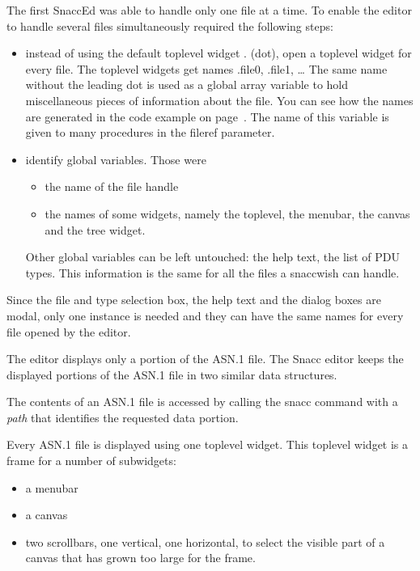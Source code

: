The first SnaccEd was able to handle only one file at a time.
To enable the editor to handle several files simultaneously required the following steps:
\begin{itemize}
  \item instead of using the default toplevel widget {\Tcl .} (dot), open a toplevel widget for every file.
    The toplevel widgets get names {\Tcl .file0}, {\Tcl .file1}, \dots
    The same name without the leading dot is used as a global array variable to hold miscellaneous pieces of information about the file.
    You can see how the names are generated in the code example on page~\pageref{tcl-name-space-example-code}.
    The name of this variable is given to many procedures in the {\Tcl fileref} parameter.
  \item identify global variables. Those were
    \begin{itemize}
      \item the name of the file handle
      \item the names of some widgets, namely the toplevel, the menubar, the canvas and the tree widget.
    \end{itemize}
    Other global variables can be left untouched: the help text, the list of PDU types.
    This information is the same for all the files a snaccwish can handle.
\end{itemize}

Since the file and type selection box, the help text and the dialog boxes are modal, only one instance is needed and they can have the same names for every file opened by the editor.

The editor displays only a portion of the ASN.1 file.
The Snacc editor keeps the displayed portions of the ASN.1 file in two similar data structures.

The contents of an ASN.1 file is accessed by calling the {\Tcl snacc} command with a {\Tcl \emph{path}} that identifies the requested data portion.

Every ASN.1 file is displayed using one toplevel widget.
This toplevel widget is a frame for a number of subwidgets:
\begin{itemize}
  \item a menubar
  \item a canvas
  \item two scrollbars, one vertical, one horizontal, to select the visible part of a canvas that has grown too large for the frame.
\end{itemize}

